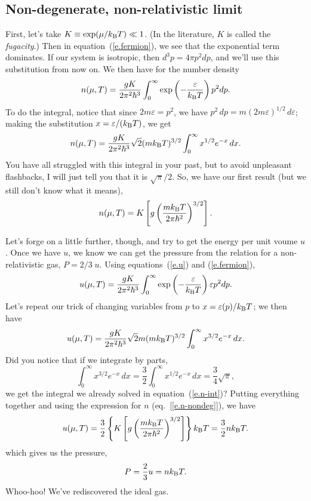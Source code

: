 \subsection{Non-degenerate, non-relativistic limit}
First, let's take $K\equiv\exp(\mu/k_\mathrm{B} T)\ll 1$. (In the literature, $K$ is called the \emph{fugacity}.) Then in equation~(\ref{e.fermion}), we see that the exponential term dominates.  If our system is isotropic, then $d^{3}p = 4\pi p^{2}dp$, and we'll use this substitution from now on.  We then have for the number density
\begin{equation}
n(\mu,T) = \frac{gK}{2\pi^{2}\hbar^{3}}\int_{0}^{\infty}\exp\left(-\frac{\varepsilon}{k_\mathrm{B} T}\right) p^{2}dp.
\end{equation}
To do the integral, notice that since $2m\varepsilon = p^{2}$, we have $p^{2}\,dp = m(2m\varepsilon)^{1/2}\,d\varepsilon$; making the substitution $x = \varepsilon/(k_\mathrm{B} T)$, we get
\begin{equation}\label{e.n-int}
n(\mu,T) = \frac{gK}{2\pi^{2}\hbar^{3}}\sqrt{2}(mk_\mathrm{B} T)^{3/2}\int_{0}^{\infty} x^{1/2}e^{-x}\,dx.
\end{equation}
You have all struggled with this integral in your past, but to avoid unpleasant flashbacks, I will just tell you that it is $\sqrt{\pi}/2$.  So, we have our first result (but we still don't know what it means),
\begin{equation}\label{e.n-nondeg}
n(\mu,T) = K\left[g\left(\frac{mk_\mathrm{B} T}{2\pi\hbar^{2}}\right)^{3/2}\right].
\end{equation}

Let's forge on a little further, though, and try to get the energy per unit voume $u$.  Once we have $u$, we know we can get the pressure from the relation for a non-relativistic gas, $P = 2/3\;u$.  Using equations~(\ref{e.u}) and (\ref{e.fermion}),
\begin{equation}
u(\mu,T) = \frac{gK}{2\pi^{2}\hbar^{3}}\int_{0}^{\infty}\exp\left(-\frac{\varepsilon}{k_\mathrm{B} T}\right) \varepsilon p^{2}dp.
\end{equation}
Let's repeat our trick of changing variables from $p$ to $x = \varepsilon(p)/k_\mathrm{B} T$; we then have
\begin{equation}
u(\mu,T) = \frac{gK}{2\pi^{2}\hbar^{3}}\sqrt{2}m(mk_\mathrm{B} T)^{3/2}\int_{0}^{\infty} x^{3/2}e^{-x}\,dx.
\end{equation}
Did you notice that if we integrate by parts,
\[
\int_{0}^{\infty} x^{3/2}e^{-x}\,dx =  \frac{3}{2}\int_{0}^{\infty}x^{1/2}e^{-x}\,dx = \frac{3}{4}\sqrt{\pi},
\]
we get the integral we already solved in equation~(\ref{e.n-int})?  Putting everything together and using the expression for $n$ (eq.~[\ref{e.n-nondeg}]), we have
\begin{equation}
u(\mu,T) = \frac{3}{2}\left\{K\left[g\left(\frac{mk_\mathrm{B} T}{2\pi\hbar^{2}}\right)^{3/2}\right] \right\}k_\mathrm{B} T = \frac{3}{2}nk_\mathrm{B} T.
\end{equation}
which gives us the pressure,
\begin{equation}\label{e.PVnkT}
P = \frac{2}{3} u = n k_\mathrm{B} T.
\end{equation}
Whoo-hoo!  We've rediscovered the ideal gas.

